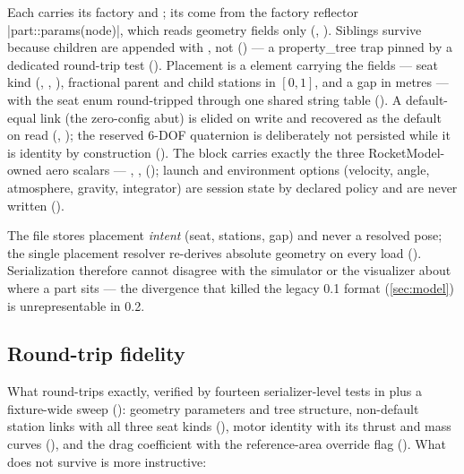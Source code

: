 Each  carries its factory  and ; its  come from
the factory reflector \cppinline|part::params(node)|, which reads geometry fields only
(, ). Siblings survive
because children are appended with , not 
() --- a property\_tree trap pinned by a dedicated round-trip
test (). Placement is a  element carrying
the  fields --- seat kind (, , ),
fractional parent and child stations in $[0,1]$, and a gap in metres --- with the seat enum
round-tripped through one shared string table (). A
default-equal link (the zero-config abut) is elided on write and recovered as the default on read
(, ); the reserved 6-DOF
 quaternion is deliberately not persisted while it is identity by construction
(). The  block carries exactly the three
RocketModel-owned aero scalars --- , ,
 (); launch and environment
options (velocity, angle, atmosphere, gravity, integrator) are session state by declared policy and
are never written ().

\begin{designrule}
The file stores placement \emph{intent} (seat, stations, gap) and never a resolved pose; the
single placement resolver re-derives absolute geometry on every load
(). Serialization therefore cannot disagree with the simulator
or the visualizer about where a part sits --- the divergence that killed the legacy 0.1 format
(\cref{sec:model}) is unrepresentable in 0.2.
\end{designrule}

\subsection{Round-trip fidelity}

What round-trips exactly, verified by fourteen serializer-level tests in
 plus a fixture-wide sweep
(): geometry parameters and tree structure, non-default
station links with all three seat kinds (), motor
identity with its thrust and mass curves (), and the
drag coefficient with the reference-area override flag
(). What does not survive is more instructive:

